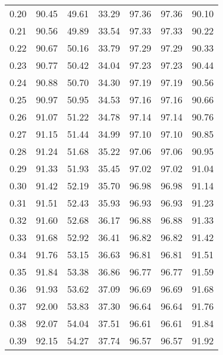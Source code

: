 \begin{tabular}{|c|c|c|c|c|c|c|}
      0.20 &     90.45 &     49.61 &      33.29 &   97.36 &      97.36 &         90.10 \\
      0.21 &     90.56 &     49.89 &      33.54 &   97.33 &      97.33 &         90.22 \\
      0.22 &     90.67 &     50.16 &      33.79 &   97.29 &      97.29 &         90.33 \\
      0.23 &     90.77 &     50.42 &      34.04 &   97.23 &      97.23 &         90.44 \\
      0.24 &     90.88 &     50.70 &      34.30 &   97.19 &      97.19 &         90.56 \\
      0.25 &     90.97 &     50.95 &      34.53 &   97.16 &      97.16 &         90.66 \\
      0.26 &     91.07 &     51.22 &      34.78 &   97.14 &      97.14 &         90.76 \\
      0.27 &     91.15 &     51.44 &      34.99 &   97.10 &      97.10 &         90.85 \\
      0.28 &     91.24 &     51.68 &      35.22 &   97.06 &      97.06 &         90.95 \\
      0.29 &     91.33 &     51.93 &      35.45 &   97.02 &      97.02 &         91.04 \\
      0.30 &     91.42 &     52.19 &      35.70 &   96.98 &      96.98 &         91.14 \\
      0.31 &     91.51 &     52.43 &      35.93 &   96.93 &      96.93 &         91.23 \\
      0.32 &     91.60 &     52.68 &      36.17 &   96.88 &      96.88 &         91.33 \\
      0.33 &     91.68 &     52.92 &      36.41 &   96.82 &      96.82 &         91.42 \\
      0.34 &     91.76 &     53.15 &      36.63 &   96.81 &      96.81 &         91.51 \\
      0.35 &     91.84 &     53.38 &      36.86 &   96.77 &      96.77 &         91.59 \\
      0.36 &     91.93 &     53.62 &      37.09 &   96.69 &      96.69 &         91.68 \\
      0.37 &     92.00 &     53.83 &      37.30 &   96.64 &      96.64 &         91.76 \\
      0.38 &     92.07 &     54.04 &      37.51 &   96.61 &      96.61 &         91.84 \\
      0.39 &     92.15 &     54.27 &      37.74 &   96.57 &      96.57 &         91.92 \\

\end{tabular}
